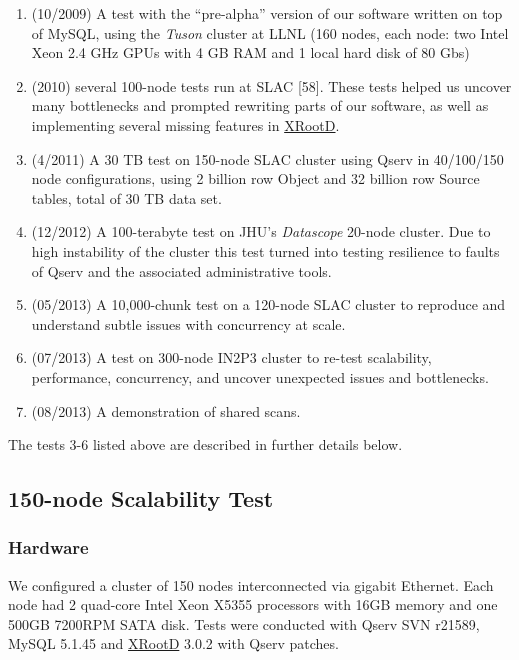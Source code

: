 \documentclass[DM,lsstdraft,toc]{lsstdoc}
\begin{document}
\begin{enumerate}
\def\labelenumi{\arabic{enumi}.}
\item
  (10/2009) A test with the ``pre-alpha'' version of our software
  written on top of MySQL, using the \emph{Tuson} cluster at LLNL (160
  nodes, each node: two Intel Xeon 2.4 GHz GPUs with 4 GB RAM and 1
  local hard disk of 80 Gbs)
\item
  (2010) several 100-node tests run at SLAC {[}58{]}. These tests helped
  us uncover many bottlenecks and prompted rewriting parts of our
  software, as well as implementing several missing features in
  \href{http://xrootd.org}{XRootD}.
\item
  (4/2011) A 30 TB test on 150-node SLAC cluster using Qserv in
  40/100/150 node configurations, using 2 billion row Object and 32
  billion row Source tables, total of 30 TB data set.
\item
  (12/2012) A 100-terabyte test on JHU's \emph{Datascope} 20-node
  cluster. Due to high instability of the cluster this test turned into
  testing resilience to faults of Qserv and the associated
  administrative tools.
\item
  (05/2013) A 10,000-chunk test on a 120-node SLAC cluster to reproduce
  and understand subtle issues with concurrency at scale.
\item
  (07/2013) A test on 300-node IN2P3 cluster to re-test scalability,
  performance, concurrency, and uncover unexpected issues and
  bottlenecks.
\item
  (08/2013) A demonstration of shared scans.
\end{enumerate}

The tests 3-6 listed above are described in further details below.

\subsection{150-node Scalability Test}\label{node-scalability-test}

\subsubsection{Hardware}\label{hardware}

We configured a cluster of 150 nodes interconnected via gigabit
Ethernet. Each node had 2 quad-core Intel Xeon X5355 processors with
16GB memory and one 500GB 7200RPM SATA disk. Tests were conducted with
Qserv SVN r21589, MySQL 5.1.45 and \href{http://xrootd.org}{XRootD}
3.0.2 with Qserv patches.
\end{document}
